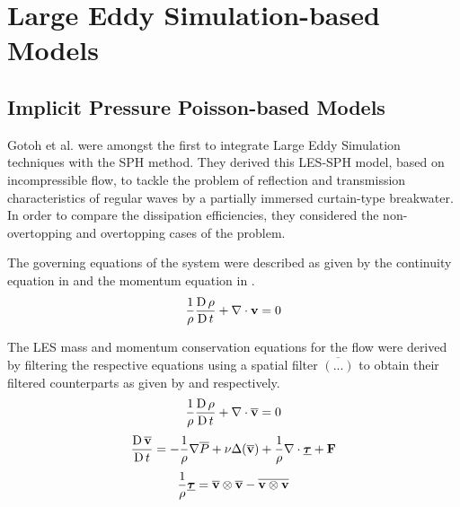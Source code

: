 \section{Large Eddy Simulation-based Models}
\subsection{Implicit Pressure Poisson-based Models}
\label{sec:Implicit-Pressure-Poisson-based-Models}
Gotoh et al. \parencite{Gotoh2004} were amongst the first to integrate Large Eddy Simulation techniques with the SPH method. They derived this LES-SPH model, based on incompressible flow, to tackle the problem of reflection and transmission characteristics of regular waves by a partially immersed curtain-type breakwater. In order to compare the dissipation efficiencies, they considered the non-overtopping and overtopping cases of the problem.

The governing equations of the system were described as given by the continuity equation in  and the momentum equation in .
\begin{equation}
    \frac{1}{\rho} \frac{\operatorname{D} \rho}{\operatorname{D} t} + \nabla \cdot \mathbf{v} = 0
    \label{eq:Gotoh2004-continuity-governing}
\end{equation}

The LES mass and momentum conservation equations for the flow were derived by filtering the respective equations using a spatial filter $\overline{(...)}$ to obtain their filtered counterparts as given by  and  respectively.
\begin{equation}
    \frac{1}{\rho} \frac{\operatorname{D} \rho}{\operatorname{D} t} + \nabla \cdot \mathbf{\overline{v}} = 0
    \label{eq:Gotoh2004-continuity-filtered}
\end{equation}
\begin{equation}
    \frac{\operatorname{D} \mathbf{\overline{v}}}{\operatorname{D} t} = -\frac{1}{\rho}\nabla \overline{P} + \nu \Delta ( \mathbf{\overline{v}} ) + \frac{1}{\rho}\nabla\cdot\underline{\bm{\tau}} + \mathbf{F}
    \label{eq:Gotoh2004-mom-filtered}
\end{equation}
\begin{equation}
    \frac{1}{\rho} \underline{\bm{\tau}} = \mathbf{\overline{v}} \otimes \mathbf{\overline{v}} - \overline{\mathbf{v} \otimes \mathbf{v}}
    \label{eq:Gotoh2004-stress-tensor}
\end{equation}

